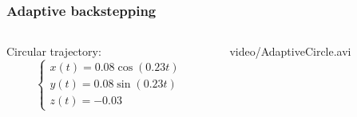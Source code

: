 \begin{frame}
\frametitle{Adaptive backstepping}
%
\begin{columns}
\begin{column}{0.4\textwidth}
	Circular trajectory:
	\begin{equation*}
		\begin{cases}
		x(t)=0.08\cos{(0.23t)}\\
		y(t)=0.08\sin{(0.23t)}\\
		z(t)=-0.03
		\end{cases}
	\end{equation*}
\end{column}
\begin{column}{0.6\textwidth}
	\begin{center}
		{video/AdaptiveCircle.avi}
	\end{center}
\end{column}
\end{columns}
\end{frame}
%
